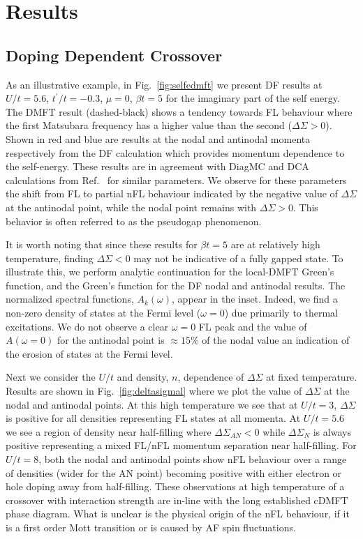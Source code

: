 \documentclass[twocolumn,notitlepage,prb,superscriptaddress,showpacs]{revtex4-1}
\begin{document}
\section{Results  \label{sec:results}}
\subsection{Doping Dependent Crossover}
As an illustrative example, in Fig.~\ref{fig:selfedmft} we present DF results at $U/t=5.6$, $t^\prime/t=-0.3$, $\mu=0$, $\beta t=5$ for the imaginary part of the self energy. The DMFT result (dashed-black) shows a tendency towards FL behaviour where the first Matsubara frequency has a higher value than the second ($\Delta \Sigma > 0$).  Shown in red and blue are results at the nodal and antinodal momenta respectively from the DF calculation which provides momentum dependence to the self-energy. 
These results are in agreement with  DiagMC and DCA calculations from  Ref.~ for similar parameters.  We observe for these parameters the shift from FL to partial nFL behaviour indicated by the negative value of $\Delta \Sigma$ at the antinodal point, while the nodal point remains with $\Delta \Sigma >0$.
This behavior is often referred to as the pseudogap phenomenon.\cite{gull:2009, ferrero:2009, yrzreview:2012, leblanc:2011} 

It is worth noting that since these results for $\beta t=5$ are at relatively high temperature, finding $\Delta \Sigma <0$ may not be indicative of a fully gapped state.  
To illustrate this, we perform analytic continuation\cite{maxent} for the local-DMFT Green's function, and the Green's function for the DF nodal and antinodal results.  
The normalized spectral functions, $A_k(\omega)$, appear in the inset.  Indeed, we find a non-zero density of states at the Fermi level ($\omega=0$) due primarily to thermal excitations.  
We do not observe a clear $\omega=0$ FL peak and the value of $A(\omega=0)$ for the antinodal point is $\approx 15\%$ of the nodal value an indication of the erosion of states at the Fermi level. 

Next we consider the $U/t$ and density, $ n $, dependence of $\Delta \Sigma$ at fixed temperature.  Results are shown in Fig.~\ref{fig:deltasigmal} where we plot the value of $\Delta \Sigma$ at the nodal and antinodal points.  At this high temperature we see that at $U/t=3$, $\Delta \Sigma$ is positive for all densities representing FL states at all momenta. 
At $U/t=5.6$ we see a region of density near half-filling where $\Delta \Sigma_{AN}<0$ while $\Delta\Sigma_N$ is always positive representing a mixed FL/nFL momentum separation near half-filling.   For $U/t=8$, both the nodal and antinodal points show nFL behaviour over a range of densities (wider for the AN point) becoming positive with either electron or hole doping away from half-filling.\cite{Gull10_clustercompare,gull:2009}
These observations at high temperature of a crossover with interaction strength are in-line with the long established cDMFT phase diagram.\cite{park:2008} What is unclear is the physical origin of the nFL behaviour, if it is a first order Mott transition or is caused by AF spin fluctuations.
\end{document}
